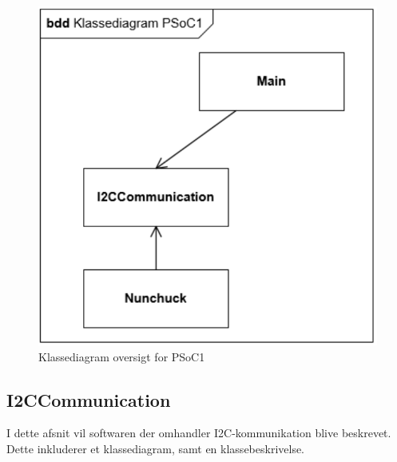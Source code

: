 \begin{figure}[H]
	\centering
	\includegraphics[width=.7\textwidth]{DesignOgImplementering/images/PSoC1KlassediagramOversigt}
	\caption{Klassediagram oversigt for PSoC1}
	\label{figure:klassediagramPSoC1}
\end{figure}

\subsection{I2CCommunication}
I dette afsnit vil softwaren der omhandler I2C-kommunikation blive beskrevet. Dette inkluderer et klassediagram, samt en klassebeskrivelse.
